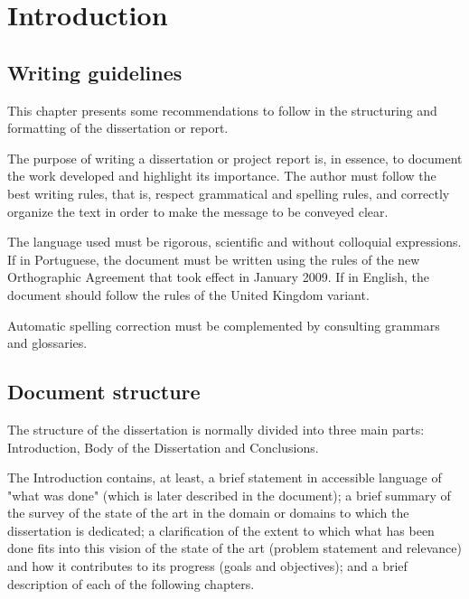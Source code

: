 % 
\chapter{Introduction} %
\label{chap:Chapter1} %


%
\section{Writing guidelines} 
\label{sec:chap1_guidelines} %

This chapter presents some recommendations to follow in the structuring and formatting of the dissertation or report.

The purpose of writing a dissertation or project report is, in essence, to document the work developed and highlight its importance. The author must follow the best writing rules, that is, respect grammatical and spelling rules, and correctly organize the text in order to make the message to be conveyed clear. 

The language used must be rigorous, scientific and without colloquial expressions. If in Portuguese, the document must be written using the rules of the new Orthographic Agreement that took effect in January 2009. If in English, the document should follow the rules of the United Kingdom variant. 

Automatic spelling correction must be complemented by consulting grammars and glossaries.

\section{Document structure}

The structure of the dissertation is normally divided into three main parts: Introduction, Body of the Dissertation and Conclusions.

The Introduction contains, at least, a brief statement in accessible language of "what was done" (which is later described in the document); a brief summary of the survey of the state of the art in the domain or domains to which the dissertation is dedicated; a clarification of the extent to which what has been done fits into this vision of the state of the art (problem statement and relevance) and how it contributes to its progress (goals and objectives); and a brief description of each of the following chapters.

